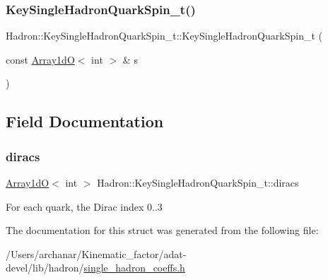 \subsubsection{\texorpdfstring{KeySingleHadronQuarkSpin\_t()}{KeySingleHadronQuarkSpin\_t()}\hspace{0.1cm}{\footnotesize\ttfamily [15/15]}}
{\footnotesize\ttfamily Hadron\+::\+Key\+Single\+Hadron\+Quark\+Spin\+\_\+t\+::\+Key\+Single\+Hadron\+Quark\+Spin\+\_\+t (\begin{DoxyParamCaption}\item[{const \mbox{\hyperlink{classADAT_1_1Array1dO}{Array1dO}}$<$ int $>$ \&}]{s }\end{DoxyParamCaption})\hspace{0.3cm}{\ttfamily [inline]}}



\subsection{Field Documentation}
\mbox{\label{structHadron_1_1KeySingleHadronQuarkSpin__t_ac351a0ae22cfe303f2951feb0261e083}} 
\subsubsection{\texorpdfstring{diracs}{diracs}}
{\footnotesize\ttfamily \mbox{\hyperlink{classADAT_1_1Array1dO}{Array1dO}}$<$ int $>$ Hadron\+::\+Key\+Single\+Hadron\+Quark\+Spin\+\_\+t\+::diracs}

For each quark, the Dirac index 0..3 

The documentation for this struct was generated from the following file\+:\begin{DoxyCompactItemize}
\item 
/\+Users/archanar/\+Kinematic\+\_\+factor/adat-\/devel/lib/hadron/\mbox{\hyperlink{adat-devel_2lib_2hadron_2single__hadron__coeffs_8h}{single\+\_\+hadron\+\_\+coeffs.\+h}}\end{DoxyCompactItemize}
